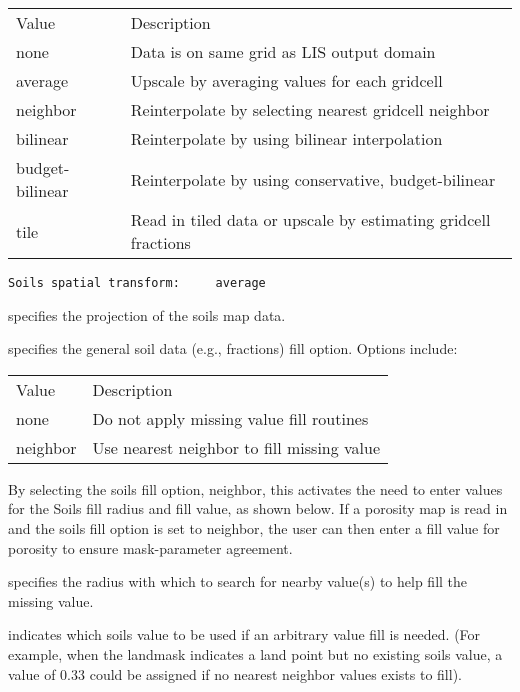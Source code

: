  \begin{tabular}{ll}
 Value   & Description                                           \\
 none      & Data is on same grid as LIS output domain           \\
 average   & Upscale by averaging values for each gridcell       \\
 neighbor  & Reinterpolate by selecting nearest gridcell neighbor \\
 bilinear  & Reinterpolate by using bilinear interpolation        \\
 budget-bilinear & Reinterpolate by using conservative, budget-bilinear \\
 tile      &  Read in tiled data or upscale by estimating gridcell
              fractions                                            \\
 \end{tabular}
 

 \begin{Verbatim}[frame=single]
Soils spatial transform:     average 
 \end{Verbatim}

 
  specifies the projection of the
 soils map data.

  specifies the general soil
 data (e.g., fractions) fill option.  Options include:

 \begin{tabular}{ll}
 Value    & Description                                 \\
 none     &  Do not apply missing value fill routines   \\
 neighbor &  Use nearest neighbor to fill missing value \\
 \end{tabular}

 By selecting the soils fill option, neighbor, this activates the
 need to enter values for the Soils fill radius and fill value, as
 shown below.  If a porosity map is read in and the soils fill option
 is set to neighbor, the user can then enter a fill value for porosity
 to ensure mask-parameter agreement. 

  specifies the radius with which
 to search for nearby value(s) to help fill the missing value.

  indicates which soils
 value to be used if an arbitrary value fill is needed. 
 (For example, when the landmask indicates a land point but no existing 
 soils value, a value of 0.33 could be assigned if 
 no nearest neighbor values exists to fill).

